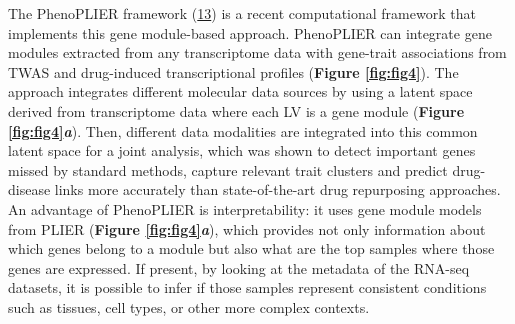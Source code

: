 The PhenoPLIER framework (\protect\hyperlink{ref-NM3rHx1i}{13}) is a recent computational framework that implements this gene module-based approach.
PhenoPLIER can integrate gene modules extracted from any transcriptome data with gene-trait associations from TWAS and drug-induced transcriptional profiles (\textbf{Figure \ref{fig:fig4}}).
The approach integrates different molecular data sources by using a latent space derived from transcriptome data where each LV is a gene module (\textbf{Figure \ref{fig:fig4}\emph{a}}).
Then, different data modalities are integrated into this common latent space for a joint analysis, which was shown to detect important genes missed by standard methods, capture relevant trait clusters and predict drug-disease links more accurately than state-of-the-art drug repurposing approaches.
An advantage of PhenoPLIER is interpretability: it uses gene module models from PLIER (\textbf{Figure \ref{fig:fig4}\emph{a}}), which provides not only information about which genes belong to a module but also what are the top samples where those genes are expressed.
If present, by looking at the metadata of the RNA-seq datasets, it is possible to infer if those samples represent consistent conditions such as tissues, cell types, or other more complex contexts.

